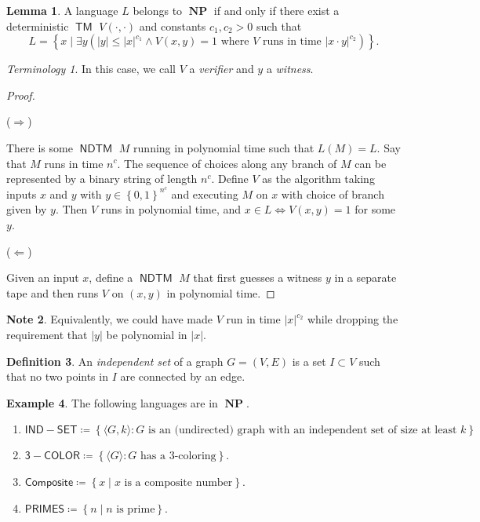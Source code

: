 \documentclass[10pt,letterpaper,cm]{nupset}
\theoremstyle{definition}
\newtheorem{definition}{Definition}[subsection]
\newtheorem{exmp}[definition]{Example}
\newtheorem{note}[definition]{Note}
\theoremstyle{theorem}
\newtheorem{lemma}[definition]{Lemma}
\theoremstyle{remark}
\newtheorem*{term}{Terminology}
\newcommand{\1}{\mathbf{1}}
\newcommand{\0}{\vec 0}
\DeclareMathOperator{\TM}{\mathsf{TM}}
\DeclareMathOperator{\NP}{\mathbf{NP}}
\DeclareMathOperator{\NDTM}{\mathsf{NDTM}}
\begin{document}
\begin{lemma}
A language $L$  belongs to $\NP$ if and only if there exist  a deterministic $\TM$ $V(\cdot, \cdot)$ and constants $c_1, c_2 >0$ such that $$L = \left\{ x \mid \exists y\left(\left\lvert{y}\right\rvert \leq \left\lvert{x}\right\rvert^{c_1} \land V\left(x,y\right) = 1 \text{ where } V \text{ runs in time }\left\lvert{x\cdot y}\right\rvert^{c_2}\right)\right\}.$$ 
\end{lemma}
\begin{term}
In this case, we call $V$ a \textit{verifier} and $y$ a \textit{witness}.
\end{term}
\begin{proof} $ $

($\Longrightarrow$) 

\smallskip

There is some $\NDTM$ $M$ running in polynomial time such that $L(M) = L$. Say that $M$ runs in time $n^c$. The sequence of choices along any branch of $M$ can be represented by a binary string of length $n^c$.
Define $V$ as the algorithm taking inputs $x$ and $y$ with $y\in  \left\{0,1\right\}^{n^c}$ and executing $M$ on $x$ with choice of branch given by $y$. Then $V$ runs in polynomial time, and $x\in L \iff V\left(x,y\right) =1$ for some $y$.

\medskip


($\Longleftarrow$)  

\smallskip

Given an input $x$, define a $\NDTM$ $M$ that first guesses a witness $y$ in a separate tape and then runs $V$ on $\left(x,y\right)$ in polynomial time. 
\end{proof}

\begin{note}
Equivalently, we could have made $V$ run in time $\left\lvert{x}\right\rvert^{c_2}$ while dropping the requirement that $\left\lvert{y}\right\rvert$ be polynomial in $\left\lvert{x}\right\rvert$. 
\end{note}

\begin{definition}
An \textit{independent set} of a graph $G=\left(V, E\right)$ is a set $I\subset V$ such that no two points in $I$ are connected by an edge. 
\end{definition}

\begin{exmp} The following languages are in $\NP$.
\begin{enumerate}
\item $\mathsf{IND{-}SET} \coloneqq \left\{\langle G, k \rangle : G\text{ is an (undirected) graph with an independent set of size at least }k\right\}$
\item $\mathsf{3{-}COLOR}\coloneqq \left\{ \langle G \rangle : G\text{ has a }3\text{-coloring}\right\}$.
\item $\mathsf{Composite} \coloneqq \left\{x \mid x\text{ is a composite number}\right\}$.
\item $\mathsf{PRIMES}\coloneqq \left\{ n \mid n\text{ is prime}\right\}$.
\end{enumerate}
\end{exmp}
\end{document}
